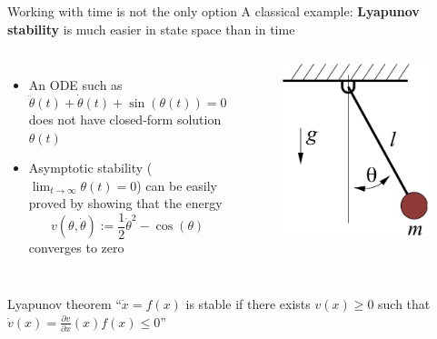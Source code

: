 \documentclass[aspectratio=169]{beamer}
\begin{document}
\begin{frame}{Working with time is not the only option}
A classical example: \textbf{Lyapunov stability} is much easier in state space than in time
\begin{columns}
\begin{itemize}
\item
An ODE such as
$$
\ddot \theta(t) + \dot \theta(t) + \sin(\theta(t)) = 0
$$
does not have closed-form solution $\theta(t)$
\item
Asymptotic stability ($\lim_{t \rightarrow \infty} \theta(t) = 0$) can be easily proved by showing that the energy
$$
v(\theta, \dot \theta) := \frac{1}{2} \dot \theta^2 - \cos(\theta)
$$
converges to zero
\end{itemize}
\begin{figure}[h]
\includegraphics[width=\columnwidth]{figures/simple_pend.png}
\end{figure}
\end{columns}
\begin{block}{Lyapunov theorem}
``$\dot x = f(x)$ is stable if there exists $v(x) \geq 0$ such that $\dot v(x) = \frac{\partial v}{\partial x} (x) f(x) \leq 0$''
\end{block}
\end{frame}
\end{document}
